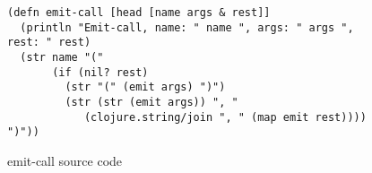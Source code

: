 \begin{figure}[ht]
\begin{verbatim}
(defn emit-call [head [name args & rest]]
  (println "Emit-call, name: " name ", args: " args ", rest: " rest)
  (str name "("
       (if (nil? rest)
         (str "(" (emit args) ")")
         (str (str (emit args)) ", " 
         	(clojure.string/join ", " (map emit rest)))) ")"))
\end{verbatim}
\caption{emit-call source code}
\label{fig:emit-call-code}
\end{figure}

